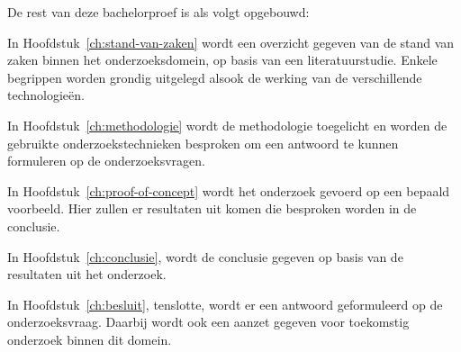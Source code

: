 De rest van deze bachelorproef is als volgt opgebouwd:

In Hoofdstuk~\ref{ch:stand-van-zaken} wordt een overzicht gegeven van de stand van zaken binnen het onderzoeksdomein, op basis van een literatuurstudie. Enkele begrippen worden grondig uitgelegd alsook de werking van de verschillende technologieën.

In Hoofdstuk~\ref{ch:methodologie} wordt de methodologie toegelicht en worden de gebruikte onderzoekstechnieken besproken om een antwoord te kunnen formuleren op de onderzoeksvragen.

In Hoofdstuk~\ref{ch:proof-of-concept} wordt het onderzoek gevoerd op een bepaald voorbeeld. Hier zullen er resultaten uit komen die besproken worden in de conclusie.

In Hoofdstuk~\ref{ch:conclusie}, wordt de conclusie gegeven op basis van de resultaten uit het onderzoek.

In Hoofdstuk~\ref{ch:besluit}, tenslotte, wordt er een antwoord geformuleerd op de onderzoeksvraag.  Daarbij wordt ook een aanzet gegeven voor toekomstig onderzoek binnen dit domein.
%

